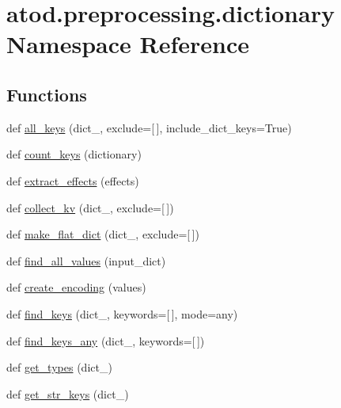 \hypertarget{namespaceatod_1_1preprocessing_1_1dictionary}{}\section{atod.\+preprocessing.\+dictionary Namespace Reference}
\label{namespaceatod_1_1preprocessing_1_1dictionary}
\subsection*{Functions}
\begin{DoxyCompactItemize}
\item 
def \hyperlink{namespaceatod_1_1preprocessing_1_1dictionary_a3c6e8d51b650b95f738d00f738fe8fd3}{all\+\_\+keys} (dict\+\_\+, exclude=\mbox{[}$\,$\mbox{]}, include\+\_\+dict\+\_\+keys=True)
\item 
def \hyperlink{namespaceatod_1_1preprocessing_1_1dictionary_a98eac5a64441066bb85d0a10a06b4408}{count\+\_\+keys} (dictionary)
\item 
def \hyperlink{namespaceatod_1_1preprocessing_1_1dictionary_a95a41297fb31441a27198e41793cafdf}{extract\+\_\+effects} (effects)
\item 
def \hyperlink{namespaceatod_1_1preprocessing_1_1dictionary_a23a40a552fdf718d4b7c1e47336ae8fa}{collect\+\_\+kv} (dict\+\_\+, exclude=\mbox{[}$\,$\mbox{]})
\item 
def \hyperlink{namespaceatod_1_1preprocessing_1_1dictionary_a4d64c4ec1edc52b9c3294ca7b7551c70}{make\+\_\+flat\+\_\+dict} (dict\+\_\+, exclude=\mbox{[}$\,$\mbox{]})
\item 
def \hyperlink{namespaceatod_1_1preprocessing_1_1dictionary_a0af7e0fe23ce68a769d9748c4c3a2ecf}{find\+\_\+all\+\_\+values} (input\+\_\+dict)
\item 
def \hyperlink{namespaceatod_1_1preprocessing_1_1dictionary_a57ac0b8d348486d8389ae259b92da289}{create\+\_\+encoding} (values)
\item 
def \hyperlink{namespaceatod_1_1preprocessing_1_1dictionary_aa55d75457292bdf99b678b2a9f90ca98}{find\+\_\+keys} (dict\+\_\+, keywords=\mbox{[}$\,$\mbox{]}, mode=\textquotesingle{}any\textquotesingle{})
\item 
def \hyperlink{namespaceatod_1_1preprocessing_1_1dictionary_addec63c00cc2c844618c260f2149bc84}{find\+\_\+keys\+\_\+any} (dict\+\_\+, keywords=\mbox{[}$\,$\mbox{]})
\item 
def \hyperlink{namespaceatod_1_1preprocessing_1_1dictionary_a2da139e18e14201e9265adb8f335bd15}{get\+\_\+types} (dict\+\_\+)
\item 
def \hyperlink{namespaceatod_1_1preprocessing_1_1dictionary_a8dc0f447ccbb2ac9789f07b9b06cb50d}{get\+\_\+str\+\_\+keys} (dict\+\_\+)
\end{DoxyCompactItemize}


